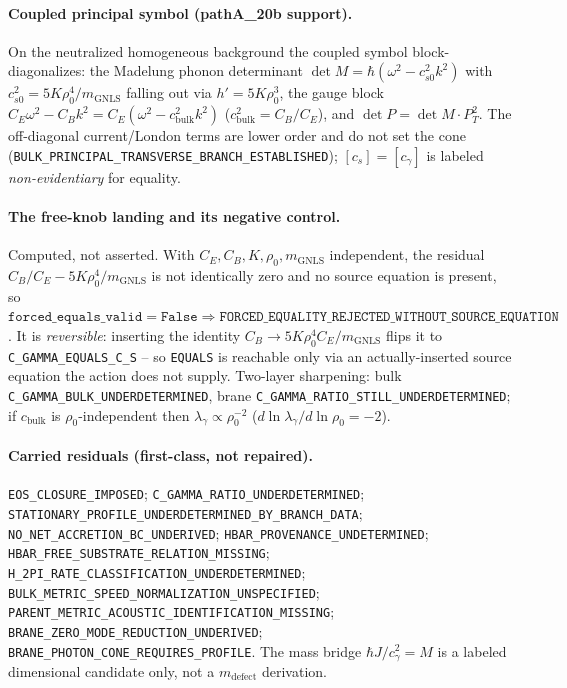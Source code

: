 \paragraph{Coupled principal symbol (pathA\_20b support).}
On the neutralized homogeneous background the coupled symbol block-diagonalizes:
the Madelung phonon determinant
\(\det M=\hbar(\omega^2-c_{s0}^2 k^2)\) with \(c_{s0}^2=5K\rho_0^4/m_{\mathrm{GNLS}}\)
falling out via \(h'=5K\rho_0^3\), the gauge block
\(C_E\omega^2-C_B k^2=C_E(\omega^2-c_{\mathrm{bulk}}^2 k^2)\)
(\(c_{\mathrm{bulk}}^2=C_B/C_E\)), and \(\det P=\det M\cdot P_T^2\). The
off-diagonal current/London terms are lower order and do not set the cone
(\texttt{BULK\_PRINCIPAL\_TRANSVERSE\_BRANCH\_ESTABLISHED}); \([c_s]=[c_\gamma]\) is
labeled \emph{non-evidentiary} for equality.

\paragraph{The free-knob landing and its negative control.}
 Computed, not asserted. With
\(C_E,C_B,K,\rho_0,m_{\mathrm{GNLS}}\) independent, the residual
\(C_B/C_E-5K\rho_0^4/m_{\mathrm{GNLS}}\) is not identically zero and no source
equation is present, so
\(\texttt{forced\_equals\_valid}=\texttt{False}\Rightarrow
\texttt{FORCED\_EQUALITY\_REJECTED\_WITHOUT\_SOURCE\_EQUATION}\). It is
\emph{reversible}: inserting the identity \(C_B\to 5K\rho_0^4 C_E/m_{\mathrm{GNLS}}\)
flips it to \texttt{C\_GAMMA\_EQUALS\_C\_S} -- so \texttt{EQUALS} is reachable only
via an actually-inserted source equation the action does not supply. Two-layer
sharpening: bulk \texttt{C\_GAMMA\_BULK\_UNDERDETERMINED}, brane
\texttt{C\_GAMMA\_RATIO\_STILL\_UNDERDETERMINED}; if \(c_{\mathrm{bulk}}\) is
\(\rho_0\)-independent then \(\lambda_\gamma\propto\rho_0^{-2}\)
(\(d\ln\lambda_\gamma/d\ln\rho_0=-2\)).

\paragraph{Carried residuals (first-class, not repaired).}
\texttt{EOS\_CLOSURE\_IMPOSED}; \texttt{C\_GAMMA\_RATIO\_UNDERDETERMINED};
\texttt{STATIONARY\_PROFILE\_UNDERDETERMINED\_BY\_BRANCH\_DATA};
\texttt{NO\_NET\_ACCRETION\_BC\_UNDERIVED}; \texttt{HBAR\_PROVENANCE\_UNDETERMINED};
\texttt{HBAR\_FREE\_SUBSTRATE\_RELATION\_MISSING};
\texttt{H\_2PI\_RATE\_CLASSIFICATION\_UNDERDETERMINED};
\texttt{BULK\_METRIC\_SPEED\_NORMALIZATION\_UNSPECIFIED};
\texttt{PARENT\_METRIC\_ACOUSTIC\_IDENTIFICATION\_MISSING};
\texttt{BRANE\_ZERO\_MODE\_REDUCTION\_UNDERIVED};
\texttt{BRANE\_PHOTON\_CONE\_REQUIRES\_PROFILE}. The mass bridge
\(\hbar J/c_\gamma^2=M\) is a labeled dimensional candidate only, not a
\(m_{\mathrm{defect}}\) derivation.
